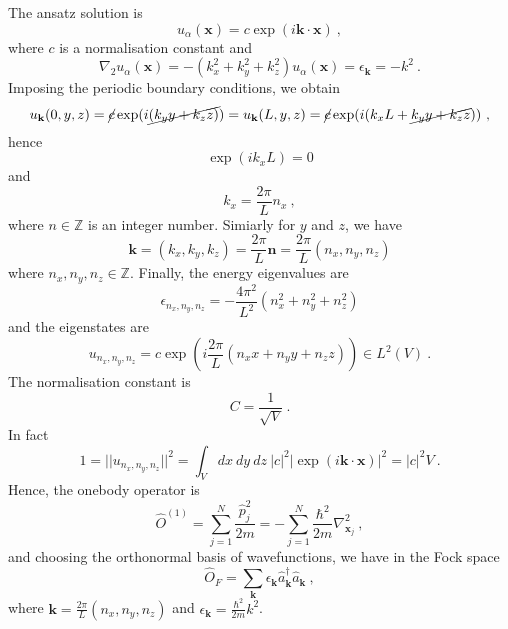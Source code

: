     The ansatz solution is 
    \begin{equation*}
        u_\alpha (\mathbf x) = c \exp(i \mathbf k \cdot \mathbf x) ~,
    \end{equation*}
    where $c$ is a normalisation constant and 
    \begin{equation*}
        \nabla_2 u_\alpha (\mathbf x) = - (k_x^2 + k_y^2 + k_z^2) u_\alpha (\mathbf x) = \epsilon_{\mathbf k} = - k^2 ~.
    \end{equation*}
    Imposing the periodic boundary conditions, we obtain 
    \begin{equation*}
        u_{\mathbf k} (0,y,z) = \cancel{c} \exp(i \cancel{(k_y y + k_z z)}) = u_{\mathbf k} (L,y,z) = \cancel{c} \exp(i (k_x L + \cancel{k_y y + k_z z})) ~,
    \end{equation*}
    hence
    \begin{equation*}
        \exp(i k_x L) = 0 
    \end{equation*}
    and 
    \begin{equation*}
        k_x = \frac{2 \pi}{L} n_x ~,
    \end{equation*}
    where $n \in \mathbb Z$ is an integer number. Simiarly for $y$ and $z$, we have 
    \begin{equation*}
        \mathbf k = (k_x, k_y, k_z) = \frac{2\pi}{L} \mathbf n = \frac{2\pi}{L} (n_x, n_y, n_z) 
    \end{equation*}
    where $n_x, n_y, n_z \in \mathbb Z$. Finally, the energy eigenvalues are 
    \begin{equation*}
        \epsilon_{n_x, n_y, n_z} = - \frac{4\pi^2}{L^2} (n_x^2 + n_y^2 + n_z^2) 
    \end{equation*}
    and the eigenstates are 
    \begin{equation*}
        u_{n_x, n_y, n_z} = c \exp(i \frac{2\pi}{L} (n_x x + n_y y + n_z z)) \in L^2(V) ~.
    \end{equation*}
    The normalisation constant is 
    \begin{equation*}
        C = \frac{1}{\sqrt{V}} ~.
    \end{equation*}
    In fact 
    \begin{equation*}
        1 = ||u_{n_x, n_y, n_z} ||^2 = \int_V dx ~ dy ~ dz ~ |c|^2 |\exp(i \mathbf k \cdot \mathbf x)|^2 = |c|^2 V ~.
    \end{equation*}
    Hence, the onebody operator is 
    \begin{equation*}
        \hat O^{(1)} = \sum_{j=1}^{N} \frac{\hat p^2_j}{2m} = - \sum_{j=1}^{N} \frac{\hbar^2}{2m} \nabla^2_{\mathbf x_j} ~,
    \end{equation*}
    and choosing the orthonormal basis of wavefunctions, we have in the Fock space 
    \begin{equation*}
        \hat O_F = \sum_{\mathbf k} \epsilon_{\mathbf k} \hat a^\dagger_{\mathbf k} \hat a_{\mathbf k} ~,
    \end{equation*}
    where $\mathbf k = \frac{2\pi}{L} (n_x, n_y, n_z)$ and $\epsilon_{\mathbf k} = \frac{\hbar^2}{2m} k^2$.

